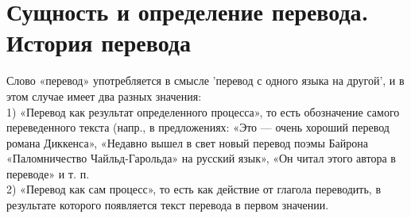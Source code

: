 \section{Сущность и определение перевода. История перевода}

Слово «перевод» употребляется в смысле 'перевод с одного языка на другой', и в этом случае имеет два разных значения:\\
1) «Перевод как результат определенного процесса», то есть обозначение самого переведенного текста (напр., в предложениях: «Это --- очень хороший перевод романа Диккенса», «Недавно вышел в свет новый перевод поэмы Байрона «Паломничество Чайльд-Гарольда» на русский язык», «Он читал этого автора в переводе» и т. п.\\
2) «Перевод как сам процесс», то есть как действие от глагола переводить, в результате которого появляется текст перевода в первом значении.










